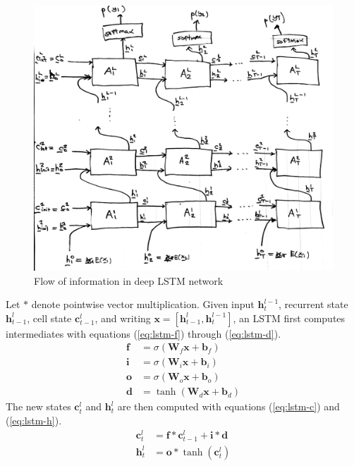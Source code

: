 \documentclass[12pt,a4paper,twoside,openright]{report}
\newcommand{\vect}[1]{\boldsymbol{\mathbf{#1}}}
\begin{document}
\begin{figure}[H]
\centering
\includegraphics[width=400pt]{figs/lstm_net_tmp.jpg}
\caption{Flow of information in deep LSTM network}
\label{fig:deep-lstm-arch}
\end{figure}

Let $\ast$ denote pointwise vector multiplication. Given input
$\vect{h}_t^{l-1}$, recurrent state $\vect{h}_{t-1}^l$, cell state
$\vect{c}_{t-1}^l$, and writing $\vect{x} = [\vect{h}_{t-1}^l,
\vect{h}_t^{l-1}]$, an LSTM first computes intermediates with equations
(\ref{eq:lstm-f}) through (\ref{eq:lstm-d}).
\begin{align}
  \vect{f} &= \sigma(\vect{W}_f \vect{x} + \vect{b}_f) \label{eq:lstm-f} \\
  \vect{i} &= \sigma(\vect{W}_i \vect{x} + \vect{b}_i) \\
  \vect{o} &= \sigma(\vect{W}_o \vect{x} + \vect{b}_o) \\
  \vect{d} &= \tanh(\vect{W}_d \vect{x} + \vect{b}_d) \label{eq:lstm-d}
\end{align}
The new states $\vect{c}_t^l$ and $\vect{h}_t^l$ are then computed with
equations (\ref{eq:lstm-c}) and (\ref{eq:lstm-h}). 
\begin{align}
  \vect{c}_t^l &= \vect{f} \ast \vect{c}_{t-1}^l + \vect{i} \ast \vect{d}
  \label{eq:lstm-c} \\
  \vect{h}_t^l &= \vect{o} \ast \tanh(\vect{c}_t^l) \label{eq:lstm-h}
\end{align}
\end{document}
